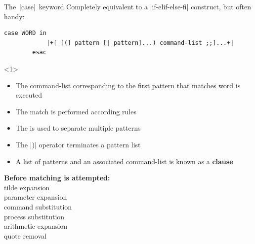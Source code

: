 
\begin{frame}[fragile]{The \,\bash|case|\, keyword}
    \vspace{-2mm}
    Completely equivalent to a \bash|if-elif-else-fi| construct, but often handy:
    \medskip
    \begin{lstlisting}[style=MyBash, numbers=none, belowskip=-5mm]
        case WORD in
            |+[ [(] pattern [| pattern]...) command-list ;;]...+|
        esac
    \end{lstlisting}
    \vspace{2mm}
    \begin{overlayarea}{\textwidth}{\textheight}
        \begin{onlyenv}<1>
            \begin{itemize}
                \setlength{\itemsep}{0mm}
                \item The command-list corresponding to the first pattern that matches word is executed
                \item The match is performed according  rules
                \item The \bash{|} is used to separate multiple patterns
                \item The \bash|)| operator terminates a pattern list
                \item A list of patterns and an associated command-list is known as a \textbf{clause}
            \end{itemize}
            \vspace{-3mm}
            \begin{center}
                \alert{\textbf{Before matching is attempted:}}\\[0.3em]
                \small
                tilde expansion\\
                parameter expansion\\
                command substitution\\
                process substitution\\
                arithmetic expansion\\
                quote removal
            \end{center}
        \end{onlyenv}

\end{overlayarea}
\end{frame}
